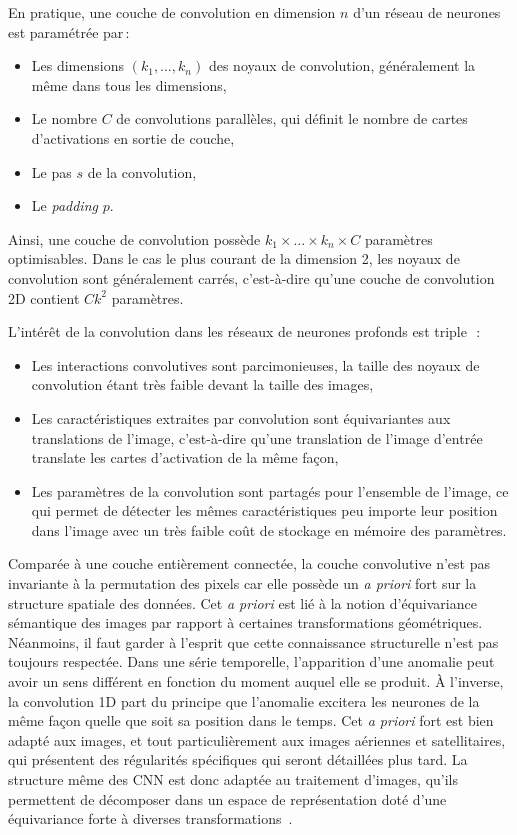 En pratique, une couche de convolution en dimension $n$ d'un réseau de neurones est paramétrée par\,:
\begin{itemize}
  \item Les dimensions $(k_1, \dots, k_n)$ des noyaux de convolution, généralement la même dans tous les dimensions,
  \item Le nombre $C$ de convolutions parallèles, qui définit le nombre de cartes d'activations en sortie de couche,
  \item Le pas $s$ de la convolution,
  \item Le \emph{padding} $p$.
\end{itemize}

Ainsi, une couche de convolution possède $k_1 \times \dots \times k_n \times C$ paramètres optimisables. Dans le cas le plus courant de la dimension 2, les noyaux de convolution sont généralement carrés, c'est-à-dire qu'une couche de convolution 2D contient $C k^2$ paramètres.

L'intérêt de la convolution dans les réseaux de neurones profonds est triple~\cite{goodfellow_deep_2016}\,:
\begin{itemize}
  \item Les interactions convolutives sont parcimonieuses, la taille des noyaux de convolution étant très faible devant la taille des images,
  \item Les caractéristiques extraites par convolution sont équivariantes aux translations de l'image, c'est-à-dire qu'une translation de l'image d'entrée translate les cartes d'activation de la même façon,
  \item Les paramètres de la convolution sont partagés pour l'ensemble de l'image, ce qui permet de détecter les mêmes caractéristiques peu importe leur position dans l'image avec un très faible coût de stockage en mémoire des paramètres.
\end{itemize}
Comparée à une couche entièrement connectée, la couche convolutive n'est pas invariante à la permutation des pixels car elle possède un \emph{a priori} fort sur la structure spatiale des données. Cet \emph{a priori} est lié à la notion d'équivariance sémantique des images par rapport à certaines transformations géométriques. Néanmoins, il faut garder à l'esprit que cette connaissance structurelle n'est pas toujours respectée. Dans une série temporelle, l'apparition d'une anomalie peut avoir un sens différent en fonction du moment auquel elle se produit. À l'inverse, la convolution 1D part du principe que l'anomalie excitera les neurones de la même façon quelle que soit sa position dans le temps. Cet \emph{a priori} fort est bien adapté aux images, et tout particulièrement aux images aériennes et satellitaires, qui présentent des régularités spécifiques qui seront détaillées plus tard. La structure même des \gls{CNN} est donc adaptée au traitement d'images, qu'ils permettent de décomposer dans un espace de représentation doté d'une équivariance forte à diverses transformations~\cite{ulyanov_deep_2017}.

